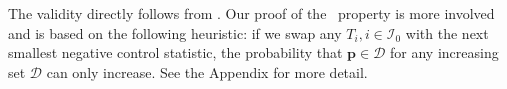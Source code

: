 \documentclass[a4paper,11pt]{article}
\theoremstyle{plain}
\theoremstyle{definition}
\def\PP{\mathbb{P}}
\def\calI{\mathcal{I}}
\theoremstyle{plain}
\newcommand{\No}{{n}}
\newcommand{\NoNc}{m}
\newcommand{\pval}[1]{{p_{#1}}}
\newcommand{\testStatistics}[1]{{T_{#1}}}
\newcommand{\nickname}{{\text{RANC}}}
\newcommand{\hypothesisIndex}[1]{{\calI_{#1}}}
\newcommand{\PRDS}{{\text{PRDS}}}
\begin{document}

The validity directly follows from . Our
proof of the \PRDS~property is more involved and is based on
the following heuristic: if we swap any $T_i, i \in
\hypothesisIndex{0}$ with the next smallest negative control
statistic, the probability that $\bm p \in \mathcal{D}$ for any
increasing set $\mathcal{D}$ can only increase. See the Appendix for
more detail.

\end{document}
